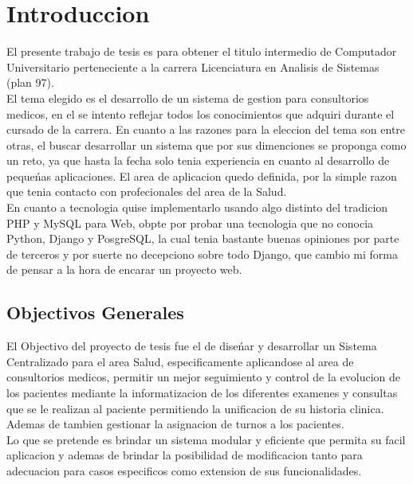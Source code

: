 \chapter{Introduccion}

El presente trabajo de tesis es para obtener el titulo intermedio de 
Computador Universitario perteneciente a la carrera Licenciatura en Analisis 
de Sistemas (plan 97).\\[0.1cm]

El tema elegido es el desarrollo de un sistema de gestion para consultorios 
medicos, en el se intento reflejar todos los conocimientos que adquiri durante
el cursado de la carrera. En cuanto a las razones para la eleccion del tema 
son entre otras, el buscar desarrollar un sistema que por sus dimenciones se
proponga como un reto, ya que hasta la fecha solo tenia experiencia en cuanto al 
desarrollo de peque\'nas aplicaciones. El area de aplicacion quedo definida, 
por la simple razon que tenia contacto con profecionales del area de la Salud.\\[0.1cm]

En cuanto a tecnologia quise implementarlo usando algo distinto del tradicion 
PHP y MySQL para Web, obpte por probar una tecnologia que no conocia Python, 
Django y PosgreSQL, la cual tenia bastante buenas opiniones por parte de 
terceros y por suerte no decepciono sobre todo Django, que cambio mi forma de
pensar a la hora de encarar un proyecto web.\\[0.1cm]

\section{Objectivos Generales}

El Objectivo del proyecto de tesis fue el de dise\'nar y desarrollar un Sistema
Centralizado para el area Salud, especificamente aplicandose al area de
consultorios medicos, permitir un mejor seguimiento y control de la evolucion
de los pacientes mediante la informatizacion de los diferentes examenes y consultas
que se le realizan al paciente permitiendo la unificacion de su historia clinica.
Ademas de tambien gestionar la asignacion de turnos a los pacientes.\\[0.1cm]

Lo que se pretende es brindar un sistema modular y eficiente que permita su
facil aplicacion y ademas de brindar la posibilidad de modificacion tanto para
adecuacion para casos especificos como extension de sus funcionalidades.\\[0.1cm]


